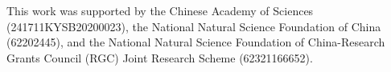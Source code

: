This work was supported by the Chinese Academy of Sciences (241711KYSB20200023), the National Natural Science Foundation of China (62202445), and the National Natural Science Foundation of China-Research Grants Council (RGC) Joint Research Scheme (62321166652).
